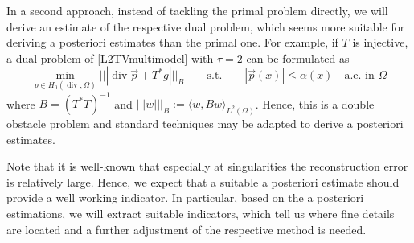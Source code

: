 \documentclass[enabledeprecatedfontcommands,cleardoublepage=empty,headsepline,twoside,11pt,DIV=15,BCOR=12mm,final]{scrartcl}
\begin{document}
In a second approach, instead of tackling the primal problem directly, we will derive an estimate of the respective dual problem, which seems more suitable for deriving a posteriori estimates than the primal one. For example, if $T$ is injective, a dual problem of \eqref{L2TVmultimodel} with $\tau=2$ can be formulated as
$$
\min_{p\in H_0(\operatorname{div},\Omega)} ||| \operatorname{div} \vec p + T^*g|||_{B} \qquad \text{s.t.} \qquad |\vec p(x)|\leq \alpha(x) \quad \text{a.e. in }\Omega
$$
where $B=(T^*T)^{-1}$ and $||| w |||_B := \langle w, B w \rangle_{L^2(\Omega)}$. Hence, this is a  double obstacle problem and standard techniques may be adapted to derive a posteriori estimates. %

Note that it is well-known that especially at singularities the reconstruction error is relatively large. Hence, we expect that a suitable a posteriori estimate should provide a well working indicator. In particular, based on the a posteriori estimations, we will extract suitable indicators, which tell us where fine details are located and a further adjustment of the respective method is needed.
\end{document}
